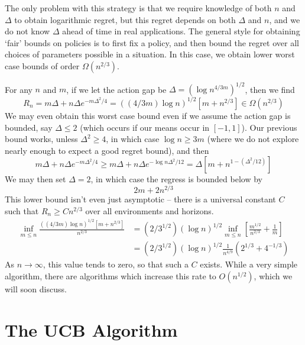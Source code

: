 The only problem with this strategy is that we require knowledge of both $n$ and $\Delta$ to obtain logarithmic regret, but this regret depends on both $\Delta$ and $n$, and we do not know $\Delta$ ahead of time in real applications. The general style for obtaining `fair' bounds on policies is to first fix a policy, and then bound the regret over all choices of parameters possible in a situation. In this case, we obtain lower worst case bounds of order $\Omega(n^{2/3})$.

For any $n$ and $m$, if we let the action gap be $\Delta = (\log n^{4/3m})^{1/2}$, then we find
%
\[ R_n = m \Delta + n \Delta e^{-m \Delta^2/4} = ((4/3m) \log n)^{1/2} [m + n^{2/3}] \in \Omega(n^{2/3}) \]
%
We may even obtain this worst case bound even if we assume the action gap is bounded, say $\Delta \leq 2$ (which occurs if our means occur in $[-1,1]$). Our previous bound works, unless $\Delta^2 \geq 4$, in which case $\log n \geq 3m$ (where we do not explore nearly enough to expect a good regret bound), and then
%
\[ m \Delta + n \Delta e^{- m \Delta^2/4} \geq m \Delta + n \Delta e^{-\log n \Delta^2/12} = \Delta[m + n^{1-(\Delta^2/12)}] \]
%
We may then set $\Delta = 2$, in which case the regress is bounded below by
%
\[ 2m + 2n^{2/3} \]
%
This lower bound isn't even just asymptotic -- there is a universal constant $C$ such that $R_n \geq C n^{2/3}$ over all environments and horizons.
%
\begin{align*}
    \inf_{m \leq n} \frac{((4/3m) \log n)^{1/2} [m + n^{2/3}]}{n^{2/3}} &= (2/3^{1/2}) (\log n)^{1/2} \inf_{m \leq n} \left[ \frac{m^{1/2}}{n^{2/3}} + \frac{1}{m} \right]\\
    &= (2/3^{1/2}) (\log n)^{1/2} \frac{1}{n^{4/9}} \left( 2^{1/3} + 4^{-1/3} \right)
\end{align*}
%
As $n \to \infty$, this value tends to zero, so that such a $C$ exists. While a very simple algorithm, there are algorithms which increase this rate to $O(n^{1/2})$, which we will soon discuss.

\chapter{The UCB Algorithm}


